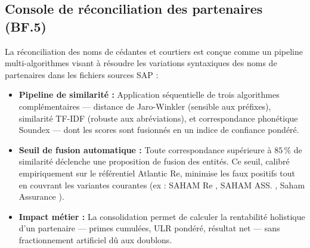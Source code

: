 \documentclass[12pt,a4paper]{report}
\begin{document}
\subsection{Console de réconciliation des partenaires (BF.5)}

La réconciliation des noms de cédantes et courtiers est conçue comme un pipeline multi-algorithmes visant à résoudre les variations syntaxiques des noms de partenaires dans les fichiers sources SAP :

\begin{itemize}[leftmargin=1.5cm, itemsep=3pt]
  \item \textbf{Pipeline de similarité :} Application séquentielle de trois algorithmes complémentaires --- distance de Jaro-Winkler (sensible aux préfixes), similarité TF-IDF (robuste aux abréviations), et correspondance phonétique Soundex --- dont les scores sont fusionnés en un indice de confiance pondéré.
  \item \textbf{Seuil de fusion automatique :} Toute correspondance supérieure à $85\,\%$ de similarité déclenche une proposition de fusion des entités. Ce seuil, calibré empiriquement sur le référentiel Atlantic Re, minimise les faux positifs tout en couvrant les variantes courantes (ex : \og SAHAM Re \fg{}, \og SAHAM ASS. \fg{}, \og Saham Assurance \fg{}).
  \item \textbf{Impact métier :} La consolidation permet de calculer la rentabilité holistique d'un partenaire --- primes cumulées, ULR pondéré, résultat net --- sans fractionnement artificiel dû aux doublons.
\end{itemize}
\end{document}

